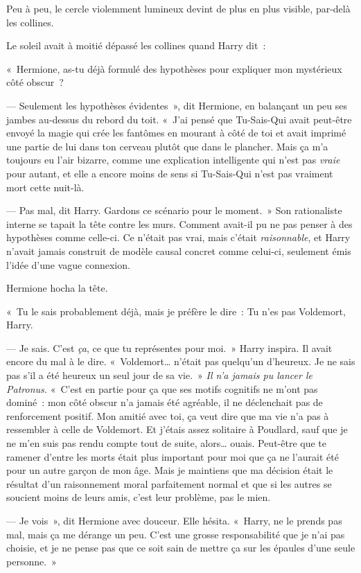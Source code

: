 Peu à peu, le cercle violemment lumineux devint de plus en plus visible, par-delà les collines.

Le soleil avait à moitié dépassé les collines quand Harry dit~:

«~Hermione, as-tu déjà formulé des hypothèses pour expliquer mon mystérieux côté obscur~?

--- Seulement les hypothèses évidentes~», dit Hermione, en balançant un peu ses jambes au-dessus du rebord du toit.
«~J'ai pensé que Tu-Sais-Qui avait peut-être envoyé la magie qui crée les fantômes en mourant à côté de toi et avait imprimé une partie de lui dans ton cerveau plutôt que dans le plancher.
Mais ça m'a toujours eu l'air bizarre, comme une explication intelligente qui n'est pas \emph{vraie} pour autant, et elle a encore moins de sens si Tu-Sais-Qui n'est pas vraiment mort cette nuit-là.

--- Pas mal, dit Harry.
Gardons ce scénario pour le moment.~»
Son rationaliste interne se tapait la tête contre les murs.
Comment avait-il pu ne pas penser à des hypothèses comme celle-ci.
Ce n'était pas vrai, mais c'était \emph{raisonnable}, et Harry n'avait jamais construit de modèle causal concret comme celui-ci, seulement émis l'idée d'une vague connexion.

Hermione hocha la tête.

«~Tu le sais probablement déjà, mais je préfère le dire~: Tu n'es pas Voldemort, Harry.

--- Je sais.
C'est \emph{ça}, ce que tu représentes pour moi.~»
Harry inspira.
Il avait encore du mal à le dire.
«~Voldemort… n'était pas quelqu'un d'heureux.
Je ne sais pas s'il a été heureux un seul jour de sa vie.~»
\emph{Il n'a jamais pu lancer le Patronus.} «~C'est en partie pour ça que ses motifs cognitifs ne m'ont pas dominé~: mon côté obscur n'a jamais été agréable, il ne déclenchait pas de renforcement positif.
Mon amitié avec toi, ça veut dire que ma vie n'a pas à ressembler à celle de Voldemort.
Et j'étais assez solitaire à Poudlard, sauf que je ne m'en suis pas rendu compte tout de suite, alors… ouais.
Peut-être que te ramener d'entre les morts était plus important pour moi que ça ne l'aurait été pour un autre garçon de mon âge.
Mais je maintiens que ma décision était le résultat d'un raisonnement moral parfaitement normal et que si les autres se soucient moins de leurs amis, c'est leur problème, pas le mien.

--- Je vois~», dit Hermione avec douceur.
Elle hésita.
«~Harry, ne le prends pas mal, mais ça me dérange un peu.
C'est une grosse responsabilité que je n'ai pas choisie, et je ne pense pas que ce soit sain de mettre ça sur les épaules d'une seule personne.~»

